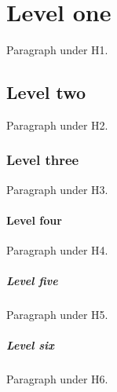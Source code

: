 \section{Level one}

Paragraph under H1.

\subsection{Level two}

Paragraph under H2.

\subsubsection{Level three}

Paragraph under H3.

\paragraph{Level four}

Paragraph under H4.

\subparagraph{Level five}

Paragraph under H5.

\subparagraph{Level six}

Paragraph under H6.

